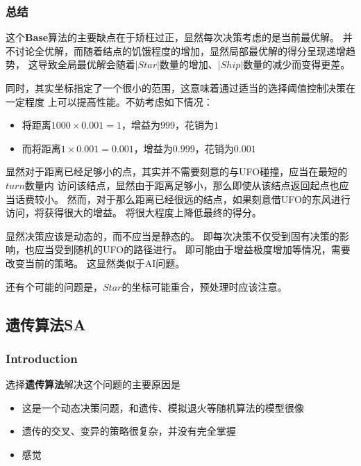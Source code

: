 \documentclass[hyperref,UTF8]{ctexart}
\theoremstyle{definition}
\theoremstyle{remark}
\numberwithin{equation}{subsection}
\newcommand{\Emph}{\textbf}
\begin{document}
\subsubsection{总结}

	这个\Emph{Base}算法的主要缺点在于矫枉过正，显然每次决策考虑的是当前最优解。
	并不讨论全优解，而随着结点的饥饿程度的增加，显然局部最优解的得分呈现递增趋势，
	这导致全局最优解会随着$|Star|$数量的增加、$|Ship|$数量的减少而变得更差。
	
	同时，其实坐标指定了一个很小的范围，这意味着通过适当的选择阈值控制决策在一定程度
	上可以提高性能。不妨考虑如下情况：
	\begin{itemize}
	
		\item 将距离$1000 \times 0.001 = 1$，增益为$999$，花销为$1$
		
		\item 而将距离$1 \times 0.001 = 0.001$，增益为$0.999$，花销为$0.001$
		
	\end{itemize}
	
	显然对于距离已经足够小的点，其实并不需要刻意的与UFO碰撞，应当在最短的$turn$数量内
	访问该结点，显然由于距离足够小，那么即使从该结点返回起点也应当话费较小。
	然而，对于那么距离已经很远的结点，如果刻意借UFO的东风进行访问，将获得很大的增益。
	将很大程度上降低最终的得分。
	
	显然决策应该是动态的，而不应当是静态的。
	即每次决策不仅受到固有决策的影响，也应当受到随机的UFO的路径进行。
	即可能由于增益极度增加等情况，需要改变当前的策略。
	这显然类似于AI问题。
	
	还有个可能的问题是，$Star$的坐标可能重合，预处理时应该注意。
	
\subsection{遗传算法SA}
\label{sec:sa}

\subsubsection{Introduction}

	选择\Emph{遗传算法}解决这个问题的主要原因是
	\begin{itemize}
		
		\item 这是一个动态决策问题，和遗传、模拟退火等随机算法的模型很像
		
		\item 遗传的交叉、变异的策略很复杂，并没有完全掌握
		
		\item 感觉
		
	\end{itemize}
	
\end{document}
